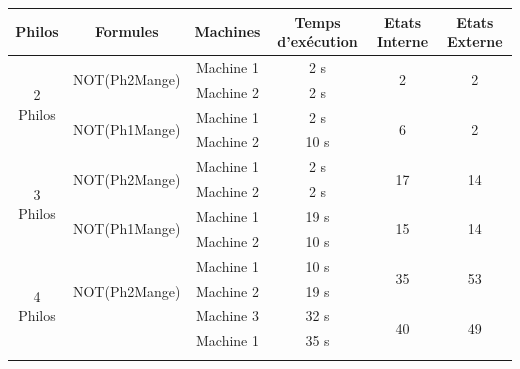 \begin{tableth}
	\centering
	\begin{tabular}{|c|c|c||c||c|c|  }
		\hline
		         Philos           &               Formules               & Machines  & Temps d'exécution &    Etats Interne     &    Etats Externe     \\ \hline
		\multirow{4}{*}{2 Philos} & \multirow{2}{*}{\tiny NOT(Ph2Mange)} & Machine 1 &        2 s        &  \multirow{2}{*}{2}  &  \multirow{2}{*}{2}  \\ \cline{3-4}
		                          &                                      & Machine 2 &        2 s        &                      &                      \\ \cline{2-4}\cline{4-6}
		                          & \multirow{2}{*}{\tiny NOT(Ph1Mange)} & Machine 1 &        2 s        &  \multirow{2}{*}{6}  &  \multirow{2}{*}{2}  \\ \cline{3-4}
		                          &                                      & Machine 2 &       10 s        &                      &                      \\ \hline\hline
		\multirow{4}{*}{3 Philos} & \multirow{2}{*}{\tiny NOT(Ph2Mange)} & Machine 1 &        2 s        & \multirow{2}{*}{17 } & \multirow{2}{*}{ 14} \\ \cline{3-4}
		                          &                                      & Machine 2 &        2 s        &                      &                      \\ \cline{2-4}\cline{4-6}
		                          & \multirow{2}{*}{\tiny NOT(Ph1Mange)} & Machine 1 &       19 s        & \multirow{2}{*}{15 } & \multirow{2}{*}{14 } \\ \cline{3-4}
		                          &                                      & Machine 2 &       10 s        &                      &                      \\ \hline\hline
		\multirow{6}{*}{4 Philos} & \multirow{3}{*}{\tiny NOT(Ph2Mange)} & Machine 1 &       10 s        & \multirow{2}{*}{35 } & \multirow{2}{*}{53 } \\ \cline{3-4}
		                          &                                      & Machine 2 &       19 s        &                      &                      \\ \cline{3-4}\cline{4-6}
		                          & \multirow{3}{*}{\tiny NOT(Ph1Mange)} & Machine 3 &       32 s        & \multirow{2}{*}{40 } & \multirow{2}{*}{49 } \\ \cline{2-4}
		                          &                                      & Machine 1 &       35 s        &                      &                      \\ \cline{3-4}\cline{4-6}

\end{tabular}
\end{tableth}
